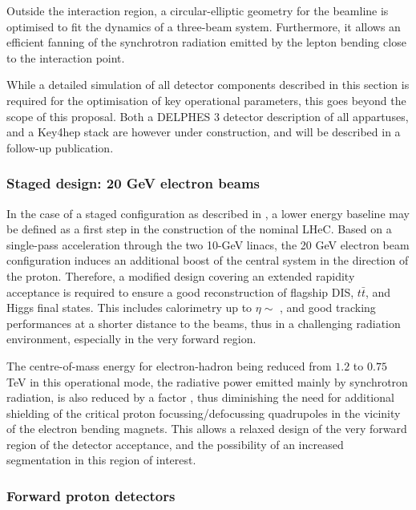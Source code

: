 
Outside the interaction region, a circular-elliptic geometry for the beamline is optimised to fit the dynamics of a three-beam system.
Furthermore, it allows an efficient fanning of the synchrotron radiation emitted by the lepton bending close to the interaction point.

While a detailed simulation of all detector components described in this section is required for the optimisation of key operational parameters, this goes beyond the scope of this proposal.
Both a DELPHES 3 detector description of all appartuses, and a Key4hep stack are however under construction, and will be described in a follow-up publication.

\subsubsection{Staged design: 20 GeV electron beams}

In the case of a staged configuration as described in \cite{Andre:2025iar}, a lower energy baseline may be defined as a first step in the construction of the nominal LHeC.
Based on a single-pass acceleration through the two 10-GeV linacs, the 20 GeV electron beam configuration induces an additional boost of the central system in the direction of the proton.
Therefore, a modified design covering an extended rapidity acceptance is required to ensure a good reconstruction of flagship DIS, $t\bar t$, and Higgs final states.
This includes calorimetry up to $\eta\sim$ , and good tracking performances at a shorter distance to the beams, thus in a challenging radiation environment, especially in the very forward region.

The centre-of-mass energy for electron-hadron being reduced from $1.2$ to $0.75$ TeV in this operational mode, the radiative power emitted mainly by synchrotron radiation, is also reduced by a factor , thus diminishing the need for additional shielding of the critical proton focussing/defocussing quadrupoles in the vicinity of the electron bending magnets.
This allows a relaxed design of the very forward region of the detector acceptance, and the possibility of an increased segmentation in this region of interest.

\subsubsection{Forward proton detectors}

